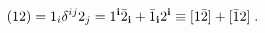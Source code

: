 \begin{equation}\label{9'}
 ({12}) = 1_i\delta^{ij}2_j = 1^{\bf i} \bar 2_{\bf i} + \bar 1_{\bf i} 2^{\bf i} \equiv [1\bar 2] 
+ [\bar 12]\;.
\end{equation}

